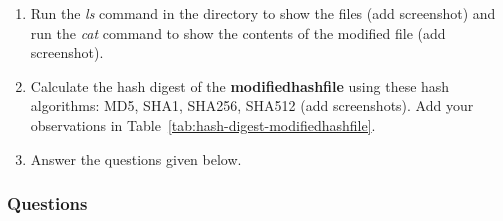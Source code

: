 \documentclass[11pt,letterpaper]{article}
\begin{document}
\begin{enumerate}
		\item Run the \textit{ls} command in the directory to show the files (add screenshot) and run the \textit{cat} command to show the contents of the modified file (add screenshot).
		
		\item Calculate the hash digest of the \textbf{modifiedhashfile} using these hash algorithms: MD5, SHA1, SHA256, SHA512 (add screenshots). Add your observations in Table~\ref{tab:hash-digest-modifiedhashfile}.
		
		\item Answer the questions given below.
		
	\end{enumerate}
	\pagebreak
	\subsubsection*{Questions}
\end{document}
